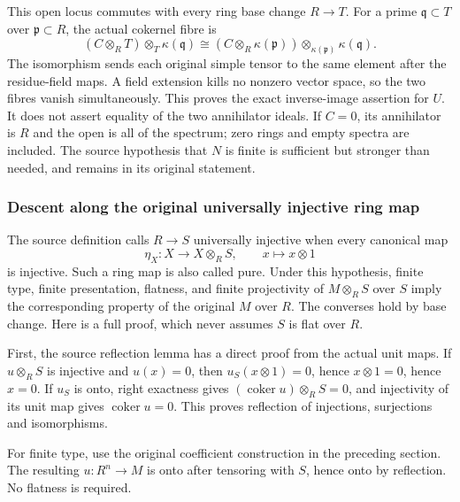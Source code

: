 This open locus commutes with every ring base change \(R\to T\). For a prime \(\mathfrak q\subset T\) over \(\mathfrak p\subset R\), the actual cokernel fibre is \[
(C\otimes_RT)\otimes_T\kappa(\mathfrak q)
\cong (C\otimes_R\kappa(\mathfrak p))\otimes_{\kappa(\mathfrak p)}\kappa(\mathfrak q).
\] The isomorphism sends each original simple tensor to the same element after the residue-field maps. A field extension kills no nonzero vector space, so the two fibres vanish simultaneously. This proves the exact inverse-image assertion for \(U\). It does not assert equality of the two annihilator ideals. If \(C=0\), its annihilator is \(R\) and the open is all of the spectrum; zero rings and empty spectra are included. The source hypothesis that \(N\) is finite is sufficient but stronger than needed, and remains in its original statement.

\subsubsection{Descent along the original universally injective ring map}\label{descent-along-the-original-universally-injective-ring-map}

The source definition calls \(R\to S\) universally injective when every canonical map \[
\eta_X:X\to X\otimes_RS,\qquad x\mapsto x\otimes1
\] is injective. Such a ring map is also called pure. Under this hypothesis, finite type, finite presentation, flatness, and finite projectivity of \(M\otimes_RS\) over \(S\) imply the corresponding property of the original \(M\) over \(R\). The converses hold by base change. Here is a full proof, which never assumes \(S\) is flat over \(R\).

First, the source reflection lemma has a direct proof from the actual unit maps. If \(u\otimes_RS\) is injective and \(u(x)=0\), then \(u_S(x\otimes1)=0\), hence \(x\otimes1=0\), hence \(x=0\). If \(u_S\) is onto, right exactness gives \((\operatorname{coker}u)\otimes_RS=0\), and injectivity of its unit map gives \(\operatorname{coker}u=0\). This proves reflection of injections, surjections and isomorphisms.

For finite type, use the original coefficient construction in the preceding section. The resulting \(u:R^n\to M\) is onto after tensoring with \(S\), hence onto by reflection. No flatness is required.

